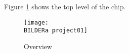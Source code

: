 
Figure \ref{fig:asTop01} shows the top level of the chip.
\begin{figure}[H] 
\centering
  \texttt{[image: \\BILDERa project01]}
\caption{\aschip \; Overview}
\label{fig:asTop01}
\end{figure}
